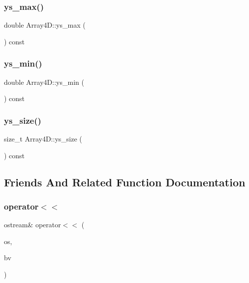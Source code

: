 \subsubsection{\texorpdfstring{ys\+\_\+max()}{ys\_max()}}
{\footnotesize\ttfamily double Array4\+D\+::ys\+\_\+max (\begin{DoxyParamCaption}{ }\end{DoxyParamCaption}) const}

\mbox{\label{class_array4_d_af27f181faf93d0ca96e65b1e5bdab82d}} 
\subsubsection{\texorpdfstring{ys\+\_\+min()}{ys\_min()}}
{\footnotesize\ttfamily double Array4\+D\+::ys\+\_\+min (\begin{DoxyParamCaption}{ }\end{DoxyParamCaption}) const}

\mbox{\label{class_array4_d_a7c08ac86562c729d9fa24165cba55a97}} 
\subsubsection{\texorpdfstring{ys\+\_\+size()}{ys\_size()}}
{\footnotesize\ttfamily size\+\_\+t Array4\+D\+::ys\+\_\+size (\begin{DoxyParamCaption}{ }\end{DoxyParamCaption}) const}



\subsection{Friends And Related Function Documentation}
\mbox{\label{class_array4_d_a268d3c7d16e43d5a82755b910b16bf00}} 
\subsubsection{\texorpdfstring{operator$<$$<$}{operator<<}}
{\footnotesize\ttfamily ostream\& operator$<$$<$ (\begin{DoxyParamCaption}\item[{ostream \&}]{os,  }\item[{\mbox{\hyperlink{class_array4_d}{Array4D}} const \&}]{bv }\end{DoxyParamCaption})\hspace{0.3cm}{\ttfamily [friend]}}



